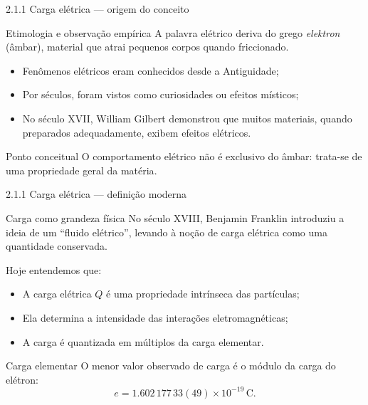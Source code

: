 \documentclass[aspectratio=169]{beamer}
\newcommand{\blue}[1]{\textcolor{myblue}{#1}}
\newcommand{\red}[1]{\textcolor{myred}{#1}}
\begin{document}
\begin{frame}{2.1.1 Carga elétrica — origem do conceito}
\begin{block}{Etimologia e observação empírica}
A palavra \blue{elétrico} deriva do grego \emph{elektron} (âmbar), material que atrai pequenos corpos quando friccionado.
\end{block}

\begin{itemize}
  \item Fenômenos elétricos eram conhecidos desde a Antiguidade;
  \item Por séculos, foram vistos como curiosidades ou efeitos místicos;
  \item No século XVII, William Gilbert demonstrou que muitos materiais,
  quando preparados adequadamente, exibem efeitos elétricos.
\end{itemize}

\begin{alertblock}{Ponto conceitual}
O comportamento elétrico não é exclusivo do âmbar: trata-se de uma \red{propriedade geral da matéria}.
\end{alertblock}
\end{frame}

\begin{frame}{2.1.1 Carga elétrica — definição moderna}
\begin{block}{Carga como grandeza física}
No século XVIII, Benjamin Franklin introduziu a ideia de um ``fluido elétrico'',
levando à noção de \blue{carga elétrica} como uma quantidade conservada.
\end{block}

Hoje entendemos que:
\begin{itemize}
  \item A carga elétrica $Q$ é uma \red{propriedade intrínseca} das partículas;
  \item Ela determina a intensidade das interações eletromagnéticas;
  \item A carga é quantizada em múltiplos da carga elementar.
\end{itemize}

\begin{block}{Carga elementar}
O menor valor observado de carga é o módulo da carga do elétron:
\begin{equation}
e = 1.602\,177\,33(49)\times 10^{-19}\,\text{C}.
\tag{2.2}
\label{eq:carga_elementar}
\end{equation}
\end{block}
\end{frame}
\end{document}
